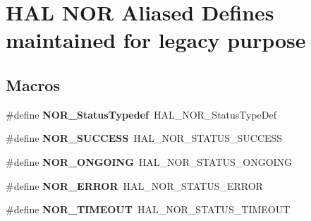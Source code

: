 \hypertarget{group___h_a_l___n_o_r___aliased___defines}{\section{H\-A\-L N\-O\-R Aliased Defines maintained for legacy purpose}
\label{group___h_a_l___n_o_r___aliased___defines}
}
\subsection*{Macros}
\begin{DoxyCompactItemize}
\item 
\hypertarget{group___h_a_l___n_o_r___aliased___defines_ga279519672efdd52720bbf3b701c03286}{\#define {\bfseries N\-O\-R\-\_\-\-Status\-Typedef}~H\-A\-L\-\_\-\-N\-O\-R\-\_\-\-Status\-Type\-Def}\label{group___h_a_l___n_o_r___aliased___defines_ga279519672efdd52720bbf3b701c03286}

\item 
\hypertarget{group___h_a_l___n_o_r___aliased___defines_ga5f4df82c08207d51443ddd3516510578}{\#define {\bfseries N\-O\-R\-\_\-\-S\-U\-C\-C\-E\-S\-S}~H\-A\-L\-\_\-\-N\-O\-R\-\_\-\-S\-T\-A\-T\-U\-S\-\_\-\-S\-U\-C\-C\-E\-S\-S}\label{group___h_a_l___n_o_r___aliased___defines_ga5f4df82c08207d51443ddd3516510578}

\item 
\hypertarget{group___h_a_l___n_o_r___aliased___defines_gac80642cc21e52c08c95cad9bbb1bfe7a}{\#define {\bfseries N\-O\-R\-\_\-\-O\-N\-G\-O\-I\-N\-G}~H\-A\-L\-\_\-\-N\-O\-R\-\_\-\-S\-T\-A\-T\-U\-S\-\_\-\-O\-N\-G\-O\-I\-N\-G}\label{group___h_a_l___n_o_r___aliased___defines_gac80642cc21e52c08c95cad9bbb1bfe7a}

\item 
\hypertarget{group___h_a_l___n_o_r___aliased___defines_gab9f3025f50c2dcddae291485261981b0}{\#define {\bfseries N\-O\-R\-\_\-\-E\-R\-R\-O\-R}~H\-A\-L\-\_\-\-N\-O\-R\-\_\-\-S\-T\-A\-T\-U\-S\-\_\-\-E\-R\-R\-O\-R}\label{group___h_a_l___n_o_r___aliased___defines_gab9f3025f50c2dcddae291485261981b0}

\item 
\hypertarget{group___h_a_l___n_o_r___aliased___defines_ga3b0bf7d05266f4dfb03d8dcb2093ab07}{\#define {\bfseries N\-O\-R\-\_\-\-T\-I\-M\-E\-O\-U\-T}~H\-A\-L\-\_\-\-N\-O\-R\-\_\-\-S\-T\-A\-T\-U\-S\-\_\-\-T\-I\-M\-E\-O\-U\-T}\label{group___h_a_l___n_o_r___aliased___defines_ga3b0bf7d05266f4dfb03d8dcb2093ab07}


\end{DoxyCompactItemize}
